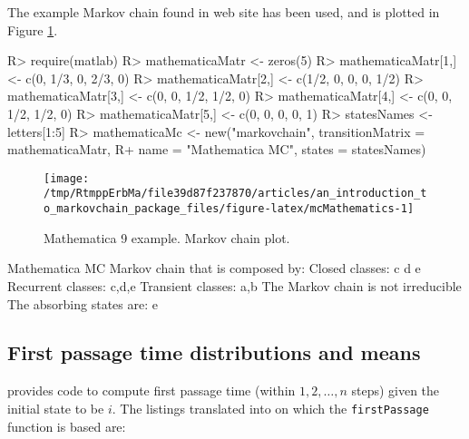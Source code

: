 \documentclass[
  nojss]{jss}
\begin{document}
The example Markov chain found in  web site \citep{mathematica9MarkovChain} has
been used, and is plotted in Figure \ref{fig:mcMathematics}.

\begin{CodeChunk}

\begin{CodeInput}
R> require(matlab)
R> mathematicaMatr <- zeros(5)
R> mathematicaMatr[1,] <- c(0, 1/3, 0, 2/3, 0)
R> mathematicaMatr[2,] <- c(1/2, 0, 0, 0, 1/2)
R> mathematicaMatr[3,] <- c(0, 0, 1/2, 1/2, 0)
R> mathematicaMatr[4,] <- c(0, 0, 1/2, 1/2, 0)
R> mathematicaMatr[5,] <- c(0, 0, 0, 0, 1)
R> statesNames <- letters[1:5]
R> mathematicaMc <- new("markovchain", transitionMatrix = mathematicaMatr,
R+                    name = "Mathematica MC", states = statesNames)
\end{CodeInput}
\end{CodeChunk}

\begin{CodeChunk}
\begin{figure}

{\centering \texttt{[image: /tmp/RtmppErbMa/file39d87f237870/articles/an\_introduction\_to\_markovchain\_package\_files/figure-latex/mcMathematics-1]} 

}

\caption[Mathematica 9 example]{Mathematica 9 example. Markov chain plot.}\label{fig:mcMathematics}
\end{figure}
\end{CodeChunk}

\begin{CodeChunk}

\begin{CodeOutput}
Mathematica MC  Markov chain that is composed by: 
Closed classes: 
c d 
e 
Recurrent classes: 
{c,d},{e}
Transient classes: 
{a,b}
The Markov chain is not irreducible 
The absorbing states are: e
\end{CodeOutput}
\end{CodeChunk}

\hypertarget{first-passage-time-distributions-and-means}{%
\subsection{First passage time distributions and means}\label{first-passage-time-distributions-and-means}}

\cite{renaldoMatlab} provides code to compute first passage time (within \(1,2,\ldots, n\) steps) given the initial state to be \(i\). The  listings translated into  on which the \texttt{firstPassage} function is based are:
\end{document}
